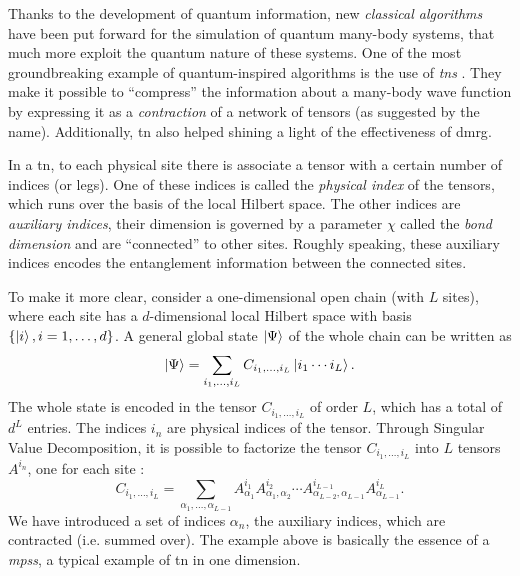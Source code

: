 Thanks to the development of quantum information, new \emph{classical algorithms} have been put forward for the simulation of quantum many-body systems, that much more exploit the quantum nature of these systems.
One of the most groundbreaking example of quantum-inspired algorithms is the use of \emph{\acp{tn}} \cite{orus2014tensor, verstraete2004algo, verstraete2008tensor, verstraete2004dmrg, vidal2008simulation, cirac2009tensor}.
They make it possible to ``compress'' the information about a many-body wave function by expressing it as a \emph{contraction} of a network of tensors (as suggested by the name).
Additionally, \ac{tn} also helped shining a light of the effectiveness of \ac{dmrg}.

In a \ac{tn}, to each physical site there is associate a tensor with a certain number of indices (or legs).
One of these indices is called the \emph{physical index} of the tensors, which runs over the basis of the local Hilbert space.
The other indices are \emph{auxiliary indices}, their dimension is governed by a parameter $\chi$ called the \emph{bond dimension} and are ``connected'' to other sites.
Roughly speaking, these auxiliary indices encodes the entanglement information between the connected sites.

To make it more clear, consider a one-dimensional open chain (with $L$ sites), where each site has a $d$-dimensional local Hilbert space with basis $\{\ket{i}, i = 1,\dots,d\}$.
A general global state $\ket{\Psi}$ of the whole chain can be written as
\begin{equation}
    \ket{\Psi} = \sum_{i_1, \dots, i_L} C_{i_1, \dots, i_L} \ket{i_1 \cdots i_L}.
\end{equation}
The whole state is encoded in the tensor $C_{i_1, \dots, i_L}$ of order $L$, which has a total of $d^L$ entries.
The indices $i_n$ are physical indices of the tensor.
Through Singular Value Decomposition, it is possible to factorize the tensor $C_{i_1, \dots, i_L}$ into $L$ tensors $A^{i_n}$, one for each site \cite{schollwock2011dmrg}:
\begin{equation}
    C_{i_1, \dots, i_L}
    = \sum_{\alpha_1, \dots, \alpha_{L-1}}
    A^{i_1}_{\alpha_1}
    A^{i_2}_{\alpha_1, \alpha_2}
    \cdots
    A^{i_{L-1}}_{\alpha_{L-2}, \alpha_{L-1}}
    A^{i_L}_{\alpha_{L-1}}.
    \label{eq:mps_decomposition}
\end{equation}
We have introduced a set of indices $\alpha_n$, the auxiliary indices, which are contracted (i.e. summed over).
The example above is basically the essence of a \emph{\acp{mps}}, a typical example of \ac{tn} in one dimension.

